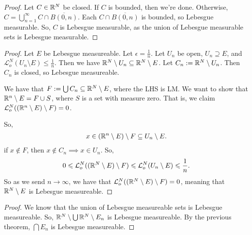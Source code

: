 \documentclass{report}
\begin{document}
\newpage
{}
\begin{proof}
    Let $C \in \RR^N$ be closed. If $C$ is bounded, then we're done. Otherwise, $C = \bigcup_{n=1}^\infty C \cap \overline{B(0, n)}$. Each $C \cap \overline{B(0, n)}$ is bounded, so Lebesgue measurable. So, $C$ is Lebesgue measurable, as the union of Lebesgue measurable sets is Lebesgue measurable.
\end{proof}
\begin{proof}
    Let $E$ be Lebesgue measureable. Let $\epsilon = \frac 1n$. Let $U_n$ be open, $U_n \supseteq E$, and $\mathcal L_o^N(U_n \setminus E) \leq \frac 1n$. Then we have $\RR^N \setminus U_n \subseteq \RR^N \setminus E$. Let $C_n := \RR^N \setminus U_n$. Then $C_n$ is closed, so Lebesgue measureable. 

    We have that $F := \bigcup C_n \subseteq \RR^N \setminus E$, where the LHS is LM. We want to show that $\RR^n \setminus E = F \cup S$, where $S$ is a set with measure zero. That is, we claim $\mathcal L_o^N((\RR^n \setminus E) \setminus F) = 0$.

    So,
    \begin{align*}
        x \in (\RR^n \setminus E) \setminus F \subseteq U_n \setminus E.
    \end{align*}
    if $x \notin F$, then $x \notin C_n \implies x \in U_n$. So,
    \begin{align*}
        0 \leq \mathcal L_o^N((\RR^N \setminus E) \setminus F) \leq \mathcal L_o^N(U_n \setminus E) \leq \frac 1n.
    \end{align*}
    So as we send $n \to \infty$, we have that $\mathcal L_o^N((\RR^N \setminus E) \setminus F) = 0$, meaning that $\RR^N \setminus E$ is Lebesgue measureable.
\end{proof}
\begin{proof}
    We know that the union of Lebesgue measureable sets is Lebesgue measureable. So, $\RR^N \setminus \bigcup \RR^N \setminus E_n$ is Lebesgue measureable. By the previous theorem, $\bigcap E_n$ is Lebesgue measureable.
\end{proof}
\newpage
{}
\end{document}
